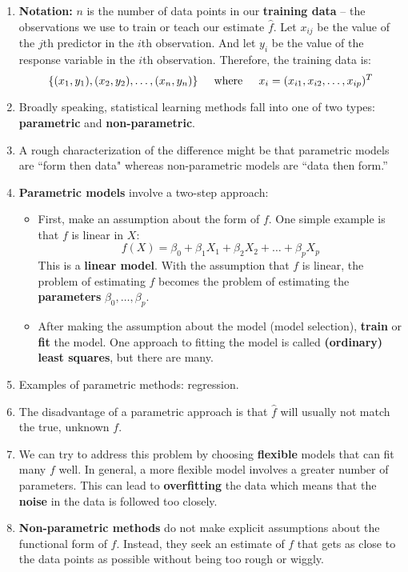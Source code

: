 \documentclass[10pt]{article}
\newcommand{\fhat}{\hat{f}}
\begin{document}
\begin{enumerate}
	\item \textbf{Notation:} $n$ is the number of data points in our \textbf{training data} -- the observations we use to train or teach our estimate $\fhat$.  Let $x_{ij}$ be the value of the $j$th predictor in the $i$th observation.  And let $y_i$ be the value of the response variable in the $i$th observation.  Therefore, the training data is:
	$$\{ (x_1, y_1), (x_2, y_2), \dots, (x_n, y_n) \} \hspace{.2in} \text{where} \hspace{.2in} x_i = (x_{i1}, x_{i2}, \dots, x_{ip})^T$$
	\item Broadly speaking, statistical learning methods fall into one of two types: \textbf{parametric} and \textbf{non-parametric}.  
	\item {\color{brown} A rough characterization of the difference might be that parametric models are ``form then data" whereas non-parametric models are ``data then form.'' }
	\item \textbf{Parametric models} involve a two-step approach:
		\begin{itemize}
			\item First, make an assumption about the form of $f$.  One simple example is that $f$ is linear in $X$:
			$$f(X) = \beta_0 + \beta_1X_1 + \beta_2X_2 + \dots + \beta_pX_p$$
			This is a \textbf{linear model}.  With the assumption that $f$ is linear, the problem of estimating $f$ becomes the problem of estimating the \textbf{parameters} $\beta_0, \dots, \beta_p$.
			\item After making the assumption about the model (model selection), \textbf{train} or \textbf{fit} the model.  One approach to fitting the model is called \textbf{(ordinary) least squares}, but there are many.
		\end{itemize}
	\item Examples of parametric methods: regression.
	\item The disadvantage of a parametric approach is that $\fhat$ will usually not match the true, unknown $f$. 
	\item We can try to address this problem by choosing \textbf{flexible} models that can fit many $f$ well.  In general, a more flexible model involves a greater number of parameters.  This can lead to \textbf{overfitting} the data which means that the \textbf{noise} in the data is followed too closely.
	\item \textbf{Non-parametric methods} do not make explicit assumptions about the functional form of $f$.  Instead, they seek an estimate of $f$ that gets as close to the data points as possible without being too rough or wiggly.

\end{enumerate}
\end{document}
